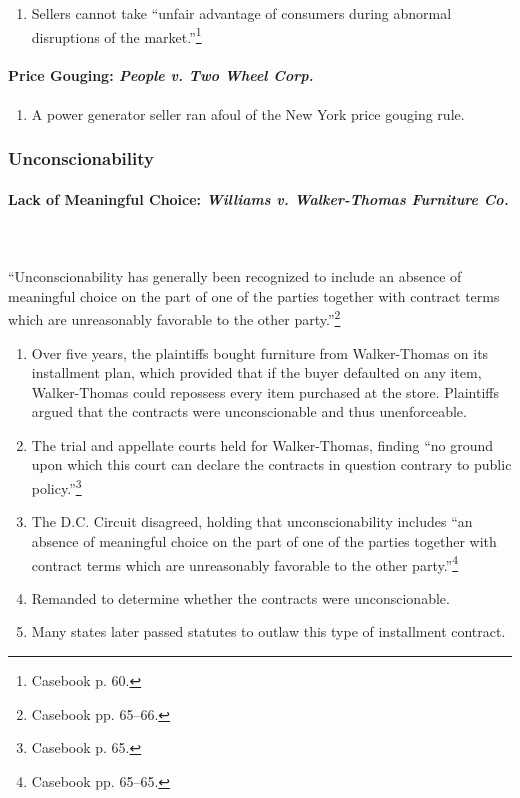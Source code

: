 \begin{enumerate}
    \item Sellers cannot take ``unfair advantage of consumers during abnormal 
    disruptions of the market.''\footnote{Casebook p. 60.}
\end{enumerate}

\paragraph{Price Gouging: \emph{People v. Two Wheel Corp.}}

\begin{enumerate}
    \item A power generator seller ran afoul of the New York price gouging 
    rule.
\end{enumerate}

\subsubsection{Unconscionability}

\paragraph{Lack of Meaningful Choice: \emph{Williams v. Walker-Thomas 
Furniture Co.}}
~\\\\
``Unconscionability has generally been recognized to include an absence of 
meaningful choice on the part of one of the parties together with contract 
terms which are unreasonably favorable to the other party.''\footnote{Casebook 
pp. 65--66.}

\begin{enumerate}
    \item Over five years, the plaintiffs bought furniture from Walker-Thomas 
    on its installment plan, which provided that if the buyer defaulted on any 
    item, Walker-Thomas could repossess every item purchased at the store. 
    Plaintiffs argued that the contracts were unconscionable and thus 
    unenforceable.
    \item The trial and appellate courts held for Walker-Thomas, finding ``no 
    ground upon which this court can declare the contracts in question 
    contrary to public policy.''\footnote{Casebook p. 65.}
    \item The D.C. Circuit disagreed, holding that unconscionability includes 
    ``an absence of meaningful choice on the part of one of the parties 
    together with contract terms which are unreasonably favorable to the other 
    party.''\footnote{Casebook pp. 65--65.}
    \item Remanded to determine whether the contracts were unconscionable.
    \item Many states later passed statutes to outlaw this type of installment 
    contract.
\end{enumerate}
 
